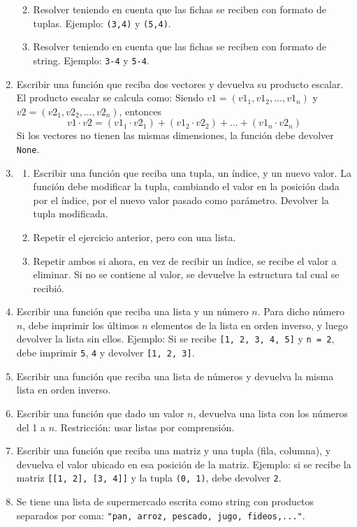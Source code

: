 \documentclass[
  letterpaper,
  DIV=11,
  numbers=noendperiod]{scrreprt}
\providecommand{\tightlist}{%
  \setlength{\itemsep}{0pt}\setlength{\parskip}{0pt}}\usepackage{longtable,booktabs,array}
\begin{document}
\begin{enumerate}
  \begin{enumerate}
  \def\labelenumii{\alph{enumii}.}
  \tightlist
  \item
    Resolver teniendo en cuenta que las fichas se reciben con formato de
    tuplas. Ejemplo: \texttt{(3,4)} y \texttt{(5,4)}.
  \item
    Resolver teniendo en cuenta que las fichas se reciben con formato de
    string. Ejemplo: \texttt{\textquotesingle{}3-4\textquotesingle{}} y
    \texttt{\textquotesingle{}5-4\textquotesingle{}}.
  \end{enumerate}
\item
  Escribir una función que reciba dos vectores y devuelva su producto
  escalar. El producto escalar se calcula como: Siendo
  \(v1 = (v1_1, v1_2, ..., v1_n)\) y \(v2 = (v2_1, v2_2, ..., v2_n)\),
  entonces\\
  \[v1 \cdot v2 = (v1_1 \cdot v2_1) + (v1_2 \cdot v2_2) + ... + (v1_n \cdot v2_n)\]
  Si los vectores no tienen las mismas dimensiones, la función debe
  devolver \texttt{None}.
\item
  \begin{enumerate}
  \def\labelenumii{\alph{enumii}.}
  \item
    Escribir una función que reciba una tupla, un índice, y un nuevo
    valor. La función debe modificar la tupla, cambiando el valor en la
    posición dada por el índice, por el nuevo valor pasado como
    parámetro. Devolver la tupla modificada.
  \item
    Repetir el ejercicio anterior, pero con una lista.
  \item
    Repetir ambos si ahora, en vez de recibir un índice, se recibe el
    valor a eliminar. Si no se contiene al valor, se devuelve la
    estructura tal cual se recibió.
  \end{enumerate}
\item
  Escribir una función que reciba una lista y un número \(n\). Para
  dicho número \(n\), debe imprimir los últimos \(n\) elementos de la
  lista en orden inverso, y luego devolver la lista sin ellos. Ejemplo:
  Si se recibe \texttt{{[}1,\ 2,\ 3,\ 4,\ 5{]}} y \texttt{n\ =\ 2}, debe
  imprimir \texttt{5}, \texttt{4} y devolver \texttt{{[}1,\ 2,\ 3{]}}.
\item
  Escribir una función que reciba una lista de números y devuelva la
  misma lista en orden inverso.
\item
  Escribir una función que dado un valor \(n\), devuelva una lista con
  los números del 1 a \(n\). Restricción: usar listas por comprensión.
\item
  Escribir una función que reciba una matriz y una tupla (fila,
  columna), y devuelva el valor ubicado en esa posición de la matriz.
  Ejemplo: si se recibe la matriz
  \texttt{{[}{[}1,\ 2{]},\ {[}3,\ 4{]}{]}} y la tupla \texttt{(0,\ 1)},
  debe devolver \texttt{2}.
\item
  Se tiene una lista de supermercado escrita como string con productos
  separados por coma:
  \texttt{"pan,\ arroz,\ pescado,\ jugo,\ fideos,..."}.


\end{enumerate}
\end{document}
